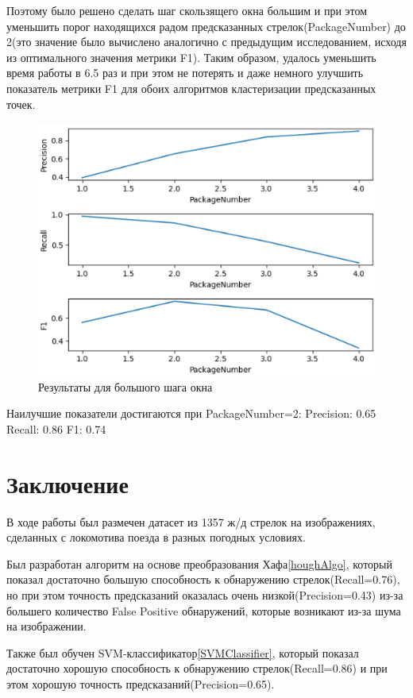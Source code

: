 Поэтому было решено сделать шаг скользящего окна большим и при этом уменьшить порог находящихся радом предсказанных стрелок(PackageNumber) до 2(это значение было вычислено аналогично с предыдущим исследованием, исходя из оптимального значения метрики F1). 
Таким образом, удалось уменьшить время работы в 6.5 раз и при этом не потерять и даже немного улучшить показатель метрики F1 для обоих алгоритмов кластеризации предсказанных точек.
\begin{figure}[h!]
	\centering
	\includegraphics[width=0.7\linewidth]{pictures/screenshot23238}
	\caption{Результаты для большого шага окна}
	\label{fig:screenshot23238}
\end{figure}\newline
Наилучшие показатели достигаются при PackageNumber=2:\newline
Precision: 0.65\newline
Recall: 0.86\newline
F1: 0.74


\chapter{Заключение}
В ходе работы был размечен датасет из 1357 ж/д стрелок на изображениях, сделанных с локомотива поезда в разных погодных условиях. 

Был разработан алгоритм на основе преобразования Хафа\ref{houghAlgo}, который показал достаточно большую способность к обнаружению стрелок(Recall=0.76), но при этом точность предсказаний оказалась очень низкой(Precision=0.43) из-за большего количество False Positive обнаружений, которые возникают из-за шума на изображении.

Также был обучен SVM-классификатор\ref{SVMClassifier}, который показал достаточно хорошую способность к обнаружению стрелок(Recall=0.86) и при этом хорошую точность предсказаний(Precision=0.65). 

